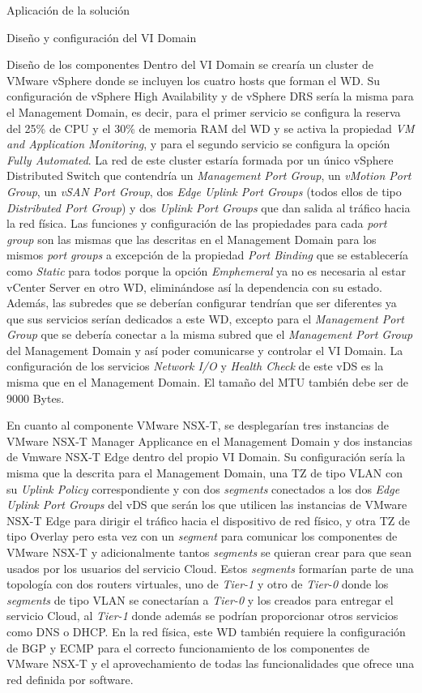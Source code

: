 \begin{chapter}{Aplicación de la solución}
\begin{section}{Diseño y configuración del VI Domain}
\begin{subsection}{Diseño de los componentes}
        Dentro del VI Domain se crearía un cluster de VMware vSphere donde se incluyen los cuatro hosts que forman el WD. Su configuración de vSphere High Availability y de vSphere DRS sería la misma para el Management Domain, es decir, para el primer servicio se configura la reserva del 25\% de CPU y el 30\% de memoria RAM del WD y se activa la propiedad \textit{VM and Application Monitoring}, y para el segundo servicio se configura la opción \textit{Fully Automated}. La red de este cluster estaría formada por un único vSphere Distributed Switch que contendría un \textit{Management Port Group}, un \textit{vMotion Port Group}, un \textit{vSAN Port Group}, dos \textit{Edge Uplink Port Groups} (todos ellos de tipo \textit{Distributed Port Group}) y dos \textit{Uplink Port Groups} que dan salida al tráfico hacia la red física. Las funciones y configuración de las propiedades para cada \textit{port group} son las mismas que las descritas en el Management Domain para los mismos \textit{port groups} a excepción de la propiedad \textit{Port Binding} que se establecería como \textit{Static} para todos porque la opción \textit{Emphemeral} ya no es necesaria al estar vCenter Server en otro WD, eliminándose así la dependencia con su estado. Además, las subredes que se deberían configurar tendrían que ser diferentes ya que sus servicios serían dedicados a este WD, excepto para el \textit{Management Port Group} que se debería conectar a la misma subred que el \textit{Management Port Group} del Management Domain y así poder comunicarse y controlar el VI Domain. La configuración de los servicios \textit{Network I/O} y \textit{Health Check} de este vDS es la misma que en el Management Domain. El tamaño del MTU también debe ser de 9000 Bytes.

        En cuanto al componente VMware NSX-T, se desplegarían tres instancias de VMware NSX-T Manager Applicance en el Management Domain y dos instancias de Vmware NSX-T Edge dentro del propio VI Domain. Su configuración sería la misma que la descrita para el Management Domain, una TZ de tipo VLAN con su \textit{Uplink Policy} correspondiente y con dos \textit{segments} conectados a los dos \textit{Edge Uplink Port Groups} del vDS que serán los que utilicen las instancias de VMware NSX-T Edge para dirigir el tráfico hacia el dispositivo de red físico, y otra TZ de tipo Overlay pero esta vez con un \textit{segment} para comunicar los componentes de VMware NSX-T y adicionalmente tantos \textit{segments} se quieran crear para que sean usados por los usuarios del servicio Cloud. Estos \textit{segments} formarían parte de una topología con dos routers virtuales, uno de \textit{Tier-1} y otro de \textit{Tier-0} donde los \textit{segments} de tipo VLAN se conectarían a \textit{Tier-0} y los creados para entregar el servicio Cloud, al \textit{Tier-1} donde además se podrían proporcionar otros servicios como DNS o DHCP. En la red física, este WD también requiere la configuración de BGP y ECMP para el correcto funcionamiento de los componentes de VMware NSX-T y el aprovechamiento de todas las funcionalidades que ofrece una red definida por software.


\end{subsection}
\end{section}
\end{chapter}
